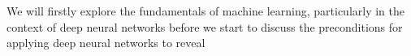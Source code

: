 We will firstly explore the fundamentals of machine learning, particularly in the context of deep neural networks before we start to discuss the preconditions for applying deep neural networks to reveal 